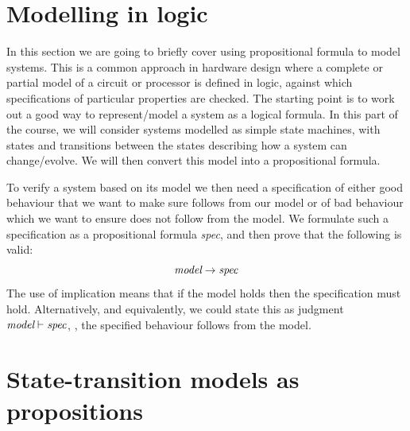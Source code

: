 \newcommand{\atomr}{\textsf{r}}
\newcommand{\atomrp}{\textsf{r'}}
\newcommand{\atomg}{\textsf{g}}
\newcommand{\atomgp}{\textsf{g'}}

\section{Modelling in logic}

In this section we are going to briefly cover using propositional
formula to model systems. This is a common approach in hardware design
where a complete or partial model of a circuit or processor is defined in logic,
against which specifications of particular properties are checked.
The starting point is to work out a good way to represent/model a
system as a logical formula. In this part of the course, we will
consider systems modelled as simple state machines, with states and
transitions between the states describing how a system can
change/evolve. We will then convert this model into a propositional
formula.

To verify a system based on its model we then need a specification of
either good behaviour that we want to make sure follows from our model
or of bad behaviour which we want to ensure does not follow from the
model.  We formulate such a specification as a propositional formula
\emph{spec}, and then prove that the following is valid:
%
\begin{equation*}
\emph{model} \rightarrow \emph{spec}
\end{equation*}
%
The use of implication means that if the model holds then
the specification must hold. Alternatively, and equivalently,
we could state this as judgment $\emph{model} \vdash \emph{spec}$,
\ie{}, the specified behaviour follows from the model.

\section{State-transition models as propositions}

